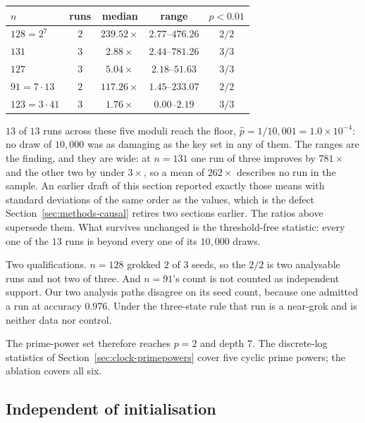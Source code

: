 \begin{center}
\begin{tabular}{lcccc}
  \toprule
  $n$ & runs & median & range & $p < 0.01$ \\
  \midrule
  $128 = 2^{7}$        & $2$ & $239.52\times$ & $2.77$--$476.26$ & $2/2$ \\
  $131$                & $3$ & $2.88\times$   & $2.44$--$781.26$ & $3/3$ \\
  $127$                & $3$ & $5.04\times$   & $2.18$--$51.63$  & $3/3$ \\
  $91 = 7 \cdot 13$    & $2$ & $117.26\times$ & $1.45$--$233.07$ & $2/2$ \\
  $123 = 3 \cdot 41$   & $3$ & $1.76\times$   & $0.00$--$2.19$   & $3/3$ \\
  \bottomrule
\end{tabular}
\end{center}

\noindent
$13$ of $13$ runs across these five moduli reach the floor, $\hat{p} = 1/10{,}001 = 1.0 \times
10^{-4}$: no draw of $10{,}000$ was as damaging as the key set in any of them.
The ranges are the finding, and they are wide: at $n = 131$ one run of three improves by $781\times$ and the
other two by under $3\times$, so a mean of $262\times$ describes no run in the sample. An
earlier draft of this section reported exactly those means with standard deviations of the
same order as the values, which is the defect Section~\ref{sec:methods-causal} retires two
sections earlier. The ratios above supersede them. What survives unchanged is the
threshold-free statistic: every one of the $13$ runs is beyond every one of its $10{,}000$
draws.

Two qualifications. $n = 128$ grokked $2$ of $3$ seeds, so the $2/2$ is two analysable runs and
not two of three. And $n = 91$'s count is not counted as independent support. Our two analysis paths disagree
on its seed count, because one admitted a run at accuracy $0.976$. Under the three-state rule
that run is a near-grok and is neither data nor control.

The prime-power set therefore reaches $p = 2$ and depth $7$. The discrete-log
statistics of Section~\ref{sec:clock-primepowers} cover five cyclic prime powers; the ablation
covers all six.

\subsection{Independent of initialisation}
\label{sec:causal-init}


